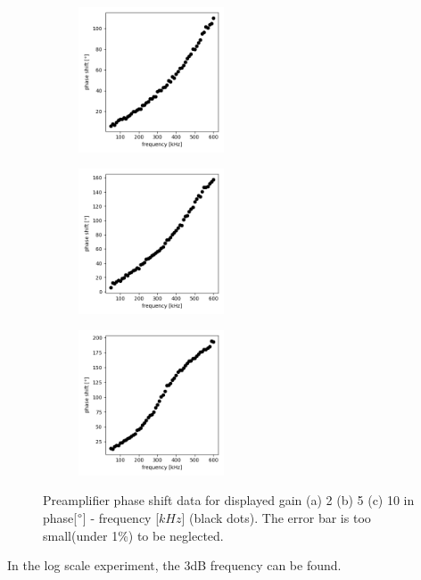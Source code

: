 \documentclass{article}
\begin{document}
  \begin{figure}[ht]
    \begin{subfigure}[b]{4.3cm}
        \centering
        \includegraphics[width=4.3cm]{../results/preamplifier_phase_freq_plot(gain2).png}
        \caption{}
    \end{subfigure}
    \hfill
    \begin{subfigure}[b]{4.3cm}
      \centering
      \includegraphics[width=4.3cm]{../results/preamplifier_phase_freq_plot(gain5).png}
      \caption{}
  \end{subfigure}
  \hfill
  \begin{subfigure}[b]{4.3cm}
    \centering
    \includegraphics[width=4.3cm]{../results/preamplifier_phase_freq_plot(gain10).png}
    \caption{}
  \end{subfigure}
  \hfill
    \caption{Preamplifier phase shift data for displayed gain (a) 2 (b) 5 (c) 10 in phase[$\degree$] - frequency [$kHz$] (black dots).
    The error bar is too small(under 1\%) to be neglected.
     }
    \label{fig: preamplifier_phase_plot}
  \end{figure}

  In the log scale experiment, the 3dB frequency can be found.
\end{document}
